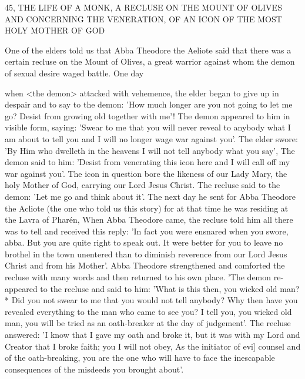 45, THE LIFE OF A MONK,
A RECLUSE ON THE MOUNT OF OLIVES
AND CONCERNING THE VENERATION,
OF AN ICON OF THE MOST HOLY MOTHER OF GOD

One of the elders told us that Abba Theodore the Aeliote said that
there was a certain recluse on the Mount of Olives, a great warrior
against whom the demon of sexual desire waged battle.
One day

when <the demon> attacked with vehemence, the elder began to
give up in despair and to say to the demon: 'How much longer are
you not going to let me go? Desist from growing old together with
me'! The demon appeared to him in visible form, saying: 'Swear to
me that you will never reveal to anybody what I am about to tell
you and I will no longer wage war against you'.
The elder swore:
'By Him who dwelleth in the heavens I will not tell anybody what
you say', The demon said to him: 'Desist from venerating this icon
here and I will call off my war against you'.
The icon in question
bore the likeness of our Lady Mary, the holy Mother of God,
carrying our Lord Jesus Christ.
The recluse said to the demon: 'Let
me go and think about it'.
The next day he sent for Abba Theodore
the Acliote (the one who told us this story) for at that time he was
residing at the Lavra of Pharén, When Abba Theodore came, the
recluse told him all there was to tell and received this reply: 'In fact
you were ensnared when you swore, abba.
But you are quite right
to speak out.
It were better for you to leave no brothel in the town
unentered than to diminish reverence from our Lord Jesus Christ
and from his Mother'.
Abba Theodore strengthened and comforted
the recluse with many words and then returned to his own place.
'The demon re-appeared to the recluse and said to him: 'What is this
then, you wicked old man?* Did you not swear to me that you
would not tell anybody? Why then have you revealed everything to
the man who came to see you? I tell you, you wicked old man, you
will be tried as an oath-breaker at the day of judgement'.
The
recluse answered: 'I know that I gave my oath and broke it, but it
was with my Lord and Creator that I broke faith; you I will not
obey, As the initiator of evi] counsel and of the oath-breaking, you
are the one who will have to face the inescapable consequences of
the misdeeds you brought about'.

